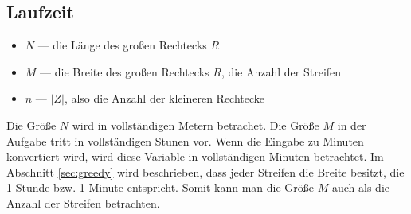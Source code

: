 \subsection{Laufzeit}
\begin{itemize}
	\item $N$ --- die Länge des großen Rechtecks $R$
	\item $M$ --- die Breite des großen Rechtecks $R$, die Anzahl der Streifen 
	\item $n$ --- $|Z|$, also die Anzahl der kleineren Rechtecke
\end{itemize}

Die Größe $N$ wird in vollständigen Metern betrachet. 
Die Größe $M$ in der Aufgabe tritt in vollständigen Stunen vor.
Wenn die Eingabe zu Minuten konvertiert wird, wird diese Variable
in vollständigen Minuten betrachtet.
Im Abschnitt \cref{sec:greedy} wird beschrieben,
dass jeder Streifen die Breite besitzt, die 1 Stunde bzw. 1 Minute entspricht.
Somit kann man die Größe $M$ auch als die Anzahl der Streifen betrachten.



